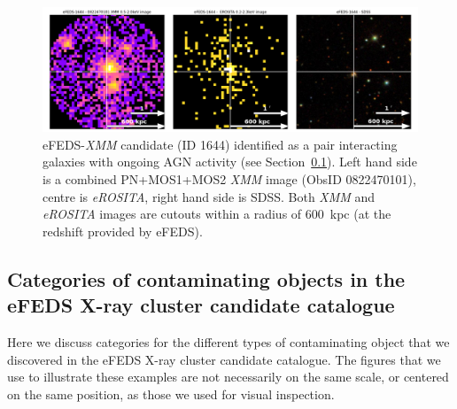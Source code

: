 \documentclass[fleqn,usenatbib]{mnras}
\begin{document}

\begin{figure}
    \centering
    \includegraphics[width=1\textwidth]{images/interacting_agn.png}
    \caption[]{eFEDS-{\em XMM} candidate (ID 1644) identified as a pair interacting galaxies with ongoing AGN activity (see Section~\ref{sec:examplerejects}). Left hand side is a combined PN+MOS1+MOS2 {\em XMM} image (ObsID 0822470101), centre is {\em eROSITA}, right hand side is SDSS. Both {\em XMM} and {\em eROSITA} images are cutouts within a radius of 600~kpc (at the redshift provided by eFEDS).}
    \label{fig:pairagn}
\end{figure}

\subsection{Categories of contaminating objects in the eFEDS X-ray cluster candidate catalogue}
\label{sec:examplerejects}
Here we discuss categories for the different types of contaminating object that we discovered in the eFEDS X-ray cluster candidate catalogue. The figures that we use to illustrate these examples are not necessarily on the same scale, or centered on the same position, as those we used for visual inspection.

\end{document}
